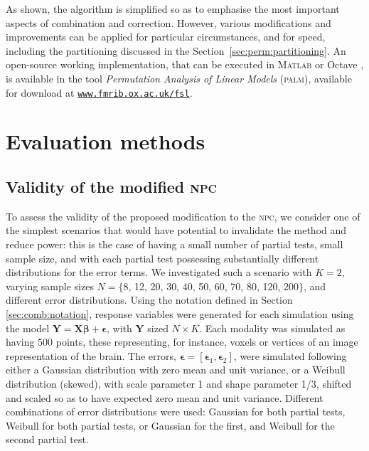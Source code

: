 As shown, the algorithm is simplified so as to emphasise the most important aspects of combination and correction. However, various modifications and improvements can be applied for particular circumstances, and for speed, including the partitioning discussed in the Section~\ref{sec:perm:partitioning}. An open-source working implementation, that can be executed in \textsc{Matlab} \citep{MATLAB2015} or Octave \citep{Eaton2015}, is available in the tool \emph{Permutation Analysis of Linear Models} (\textsc{palm}), available for download at \href{http://www.fmrib.ox.ac.uk/fsl}{\texttt{www.fmrib.ox.ac.uk/fsl}}.

\section{Evaluation methods}

\subsection{Validity of the modified \textsc{npc}}

To assess the validity of the proposed modification to the \textsc{npc}, we consider one of the simplest scenarios that would have potential to invalidate the method and reduce power: this is the case of having a small number of partial tests, small sample size, and with each partial test possessing substantially different distributions for the error terms. We investigated such a scenario with $K=2$, varying sample sizes $N = \{$8, 12, 20, 30, 40, 50, 60, 70, 80, 120, 200$\}$, and different error distributions. Using the notation defined in Section \ref{sec:comb:notation}, response variables were generated for each simulation using the model $\mathbf{Y} = \mathbf{X}\boldsymbol{\beta} + \boldsymbol{\epsilon}$, with $\mathbf{Y}$ sized $N \times K$. Each modality was simulated as having 500 points, these representing, for instance, voxels or vertices of an image representation of the brain. The errors, $\boldsymbol{\epsilon} = \left[\boldsymbol{\epsilon}_1 , \boldsymbol{\epsilon}_2\right]$, were simulated following either a Gaussian distribution with zero mean and unit variance, or a Weibull distribution (skewed), with scale parameter 1 and shape parameter 1/3, shifted and scaled so as to have expected zero mean and unit variance. Different combinations of error distributions were used: Gaussian for both partial tests, Weibull for both partial tests, or Gaussian for the first, and Weibull for the second partial test.

